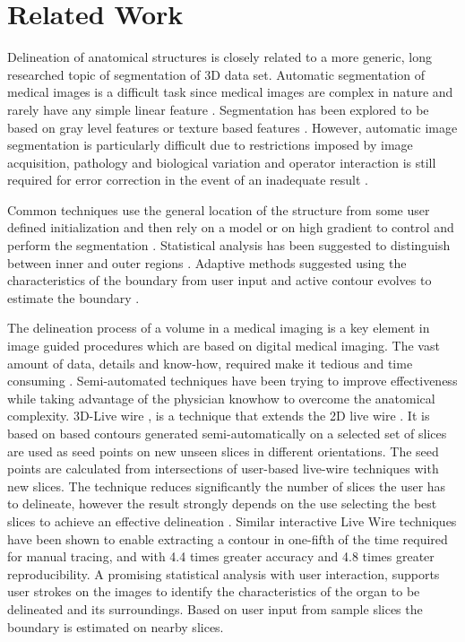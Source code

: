 
\section{Related Work}
\label{sec:related}

Delineation of anatomical structures is closely related to a more generic, long researched topic of segmentation of 3D data set. Automatic segmentation of medical images is a difficult task since medical images are complex in nature and rarely have any simple linear feature \cite{sharma2010}. Segmentation has been explored to be based on gray level features \cite{487786} or texture based features \cite{Wang1996509, Sharma2008}.   However, automatic image segmentation is particularly difficult due to restrictions imposed by image acquisition, pathology and biological variation and operator interaction is still required for error correction in the event of an inadequate result \cite{Olabarriaga2001127}. 

Common techniques use the general location of the structure from some user defined initialization and then rely on a model or on high gradient to control and perform the segmentation \cite{Kass88snakes:active, Criminisi2008, Li:2004:LS:1186562.1015719, Grady:2006:RWI:1175896.1176220}.  Statistical analysis has been suggested to distinguish between inner and outer regions \cite{902291, 4337766}.  Adaptive methods suggested using the characteristics of the boundary from user input and active contour evolves to estimate the boundary \cite{Gao20121216}.

The delineation process of a volume in a medical imaging is a key element in image guided procedures which are based on digital medical imaging. The vast amount of data, details and know-how, required make it tedious and time consuming \cite{Li:2004:LS:1186562.1015719}. Semi-automated techniques have been trying to improve effectiveness while taking advantage of the physician knowhow to overcome the anatomical complexity. 3D-Live wire \cite{Poon2008}, is a technique that extends the 2D live wire \cite{Barrett97interactivelive-wire}. It is based on based contours generated semi-automatically on a selected set of slices are used as seed points on new unseen slices in different orientations. The seed points are calculated from intersections of user-based live-wire techniques with new slices. The technique reduces significantly the number of slices the user has to delineate, however the result strongly depends on the use selecting the best slices to achieve an effective delineation \cite{Poon2008}.  Similar interactive  Live Wire techniques \cite{Barrett97interactivelive-wire} have been shown to enable extracting a contour in one-fifth of the time required for manual tracing, and with 4.4 times greater accuracy and 4.8 times greater reproducibility.  A promising statistical analysis with user interaction, \cite{hu:4547} supports user strokes on the images to identify the characteristics of the organ to be delineated and its surroundings. Based on user input from sample slices the boundary is estimated on nearby slices.

